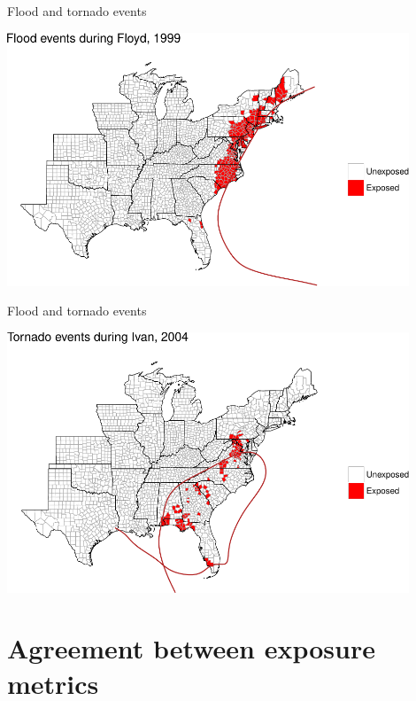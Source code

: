 \documentclass[ignorenonframetext,]{beamer}
\begin{document}
\begin{frame}{Flood and tornado events}

\begin{center}\includegraphics[width=0.9\textwidth]{anderson_jan11_files/figure-beamer/floyd_flood_example-1} \end{center}

\end{frame}

\begin{frame}{Flood and tornado events}

\begin{center}\includegraphics[width=0.9\textwidth]{anderson_jan11_files/figure-beamer/ivan_tornado_example-1} \end{center}

\end{frame}

\section{Agreement between exposure
metrics}\label{agreement-between-exposure-metrics}
\end{document}
